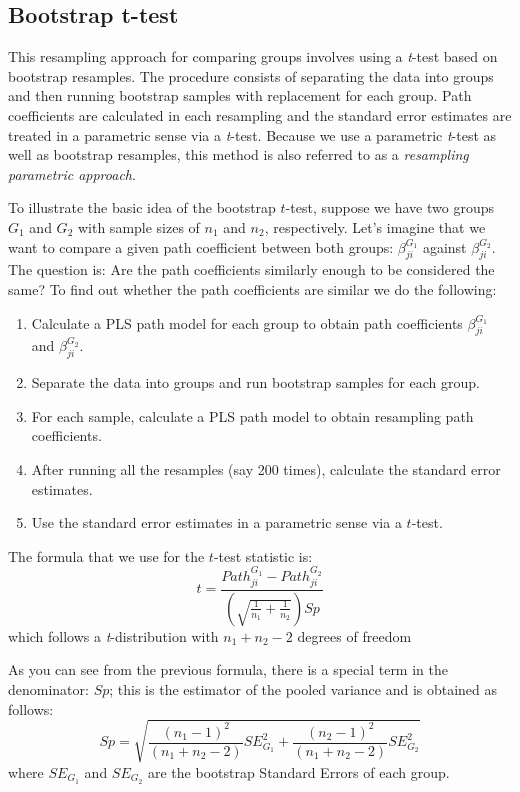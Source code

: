 \documentclass[12pt]{book}\usepackage{graphicx, color}
\begin{document}
\subsection{Bootstrap t-test}
This resampling approach for comparing groups involves using a \textit{t}-test based on bootstrap resamples. The procedure consists of separating the data into groups and then running bootstrap samples with replacement for each group. Path coefficients are calculated in each resampling and the standard error estimates are treated in a parametric sense via a \textit{t}-test. Because we use a parametric \textit{t}-test as well as bootstrap resamples, this method is also referred to as a \textit{resampling parametric approach}. 

To illustrate the basic idea of the bootstrap $t$-test, suppose we have two groups $G_1$ and $G_2$ with sample sizes of $n_1$ and $n_2$, respectively. Let's imagine that we want to compare a given path coefficient between both groups: $\beta_{ji}^{G_1}$ against $\beta_{ji}^{G_2}$. The question is: Are the path coefficients similarly enough to be considered the same? To find out whether the path coefficients are similar we do the following:

\begin{enumerate}
 \item Calculate a PLS path model for each group to obtain path coefficients $\beta_{ji}^{G_1}$ and $\beta_{ji}^{G_2}$.
 \item Separate the data into groups and run bootstrap samples for each group.
 \item For each sample, calculate a PLS path model to obtain resampling path coefficients.
 \item After running all the resamples (say 200 times), calculate the standard error estimates.
 \item Use the standard error estimates in a parametric sense via a $t$-test.
\end{enumerate}

\vspace{2mm}
The formula that we use for the $t$-test statistic is:
$$ t = \frac{Path_{ji}^{G_1} - Path_{ji}^{G_2}}
{\left( \sqrt{\frac{1}{n_1}+\frac{1}{n_2}} \right) Sp}  $$
which follows a \textit{t}-distribution with $n_1 + n_2 - 2$ degrees of freedom

As you can see from the previous formula, there is a special term in the denominator: $Sp$; this is the estimator of the pooled variance and is obtained as follows:
$$ Sp = \sqrt{\frac{(n_1-1)^2}{(n_1 + n_2 - 2)} SE_{G_1}^2 + 
\frac{(n_2-1)^2}{(n_1 + n_2 - 2)} SE_{G_2}^2}  $$
where $SE_{G_1}$ and $SE_{G_2}$ are the bootstrap Standard Errors of each group.
\end{document}

